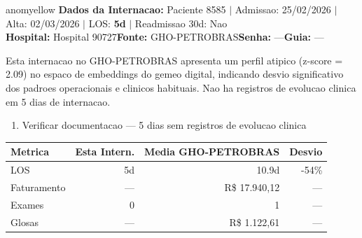 \documentclass[a4paper,10pt]{article}
\begin{document}
\begin{anomalycard}[Internacao 166670 | GHO-PETROBRAS | MODERADO (z=2.09)]{anomyellow}
\textbf{Dados da Internacao:} Paciente 8585 $\mid$ Admissao: 25/02/2026 $\mid$ Alta: 02/03/2026 $\mid$ LOS: \textbf{5d} $\mid$ Readmissao 30d: Nao\\
\textbf{Hospital:} Hospital 90727\quad\textbf{Fonte:} GHO-PETROBRAS\quad\textbf{Senha:} ---\quad\textbf{Guia:} ---\\
\vspace{2pt}\begin{tcolorbox}[colback=severityred!20,colframe=anomyellow,title={\textbf{Interpretacao de Negocio}},fonttitle=\bfseries\small,left=4pt,right=4pt,top=3pt,bottom=3pt]
{\small Esta internacao no GHO-PETROBRAS apresenta um perfil atipico (z-score = 2.09) no espaco de embeddings do gemeo digital, indicando desvio significativo dos padroes operacionais e clinicos habituais. Nao ha registros de evolucao clinica em 5 dias de internacao.}
\end{tcolorbox}
\begin{tcolorbox}[colback=severityyellow!30,colframe=anomorange,title={\textbf{Recomendacoes Especificas}},fonttitle=\bfseries\small,left=4pt,right=4pt,top=3pt,bottom=3pt]
\begin{enumerate}[nosep,leftmargin=16pt]
\item {\small Verificar documentacao --- 5 dias sem registros de evolucao clinica}
\end{enumerate}
\end{tcolorbox}
\begin{center}\begin{tabular}{l r r r}\toprule\textbf{Metrica} & \textbf{Esta Intern.} & \textbf{Media GHO-PETROBRAS} & \textbf{Desvio} \\\midrule
LOS & 5d & 10.9d & -54\% \\
Faturamento & --- & R\$ 17.940,12 & --- \\
Exames & 0 & 1 & --- \\
Glosas & --- & R\$ 1.122,61 & --- \\
\bottomrule\end{tabular}\end{center}


\end{anomalycard}
\end{document}
